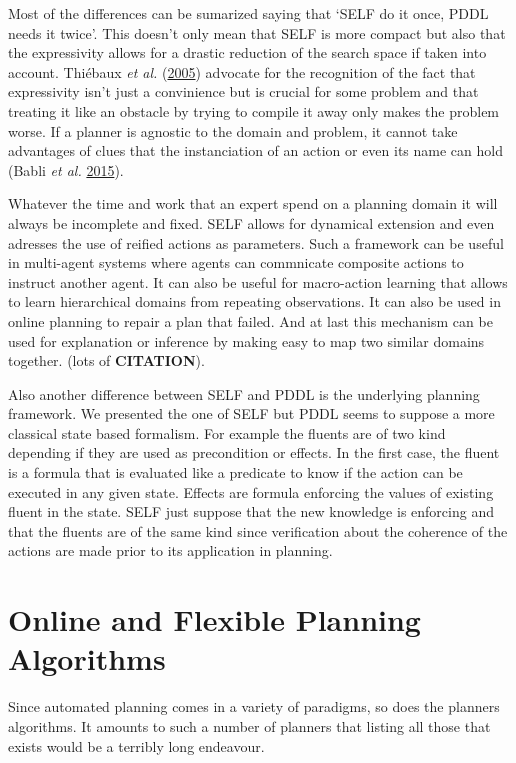 \documentclass[11pt,a4paper,twoside,openright,titlepage,numbers=noenddot,headinclude,cleardoublepage=empty,openany]{scrreprt}
\theoremstyle{plain}
\theoremstyle{definition}
\theoremstyle{remark}
\begin{document}
Most of the differences can be sumarized saying that `SELF do it once,
PDDL needs it twice'. This doesn't only mean that SELF is more compact
but also that the expressivity allows for a drastic reduction of the
search space if taken into account. Thiébaux \emph{et al.}
(\protect\hyperlink{ref-thiebaux_defense_2005}{2005}) advocate for the
recognition of the fact that expressivity isn't just a convinience but
is crucial for some problem and that treating it like an obstacle by
trying to compile it away only makes the problem worse. If a planner is
agnostic to the domain and problem, it cannot take advantages of clues
that the instanciation of an action or even its name can hold (Babli
\emph{et al.} \protect\hyperlink{ref-babli_use_2015}{2015}).

Whatever the time and work that an expert spend on a planning domain it
will always be incomplete and fixed. SELF allows for dynamical extension
and even adresses the use of reified actions as parameters. Such a
framework can be useful in multi-agent systems where agents can
commnicate composite actions to instruct another agent. It can also be
useful for macro-action learning that allows to learn hierarchical
domains from repeating observations. It can also be used in online
planning to repair a plan that failed. And at last this mechanism can be
used for explanation or inference by making easy to map two similar
domains together. (lots of \textbf{CITATION}).

Also another difference between SELF and PDDL is the underlying planning
framework. We presented the one of SELF but PDDL seems to suppose a more
classical state based formalism. For example the fluents are of two kind
depending if they are used as precondition or effects. In the first
case, the fluent is a formula that is evaluated like a predicate to know
if the action can be executed in any given state. Effects are formula
enforcing the values of existing fluent in the state. SELF just suppose
that the new knowledge is enforcing and that the fluents are of the same
kind since verification about the coherence of the actions are made
prior to its application in planning.

\hypertarget{online-and-flexible-planning-algorithms}{%
\chapter{Online and Flexible Planning
Algorithms}\label{online-and-flexible-planning-algorithms}}

Since automated planning comes in a variety of paradigms, so does the
planners algorithms. It amounts to such a number of planners that
listing all those that exists would be a terribly long endeavour.
\end{document}
